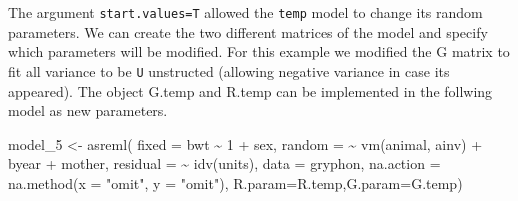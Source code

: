 \documentclass[
  12pt,
]{book}
\newenvironment{Shaded}{\begin{snugshade}}{\end{snugshade}}
\newcommand{\AttributeTok}[1]{\textcolor[rgb]{0.77,0.63,0.00}{#1}}
\newcommand{\DecValTok}[1]{\textcolor[rgb]{0.00,0.00,0.81}{#1}}
\newcommand{\FunctionTok}[1]{\textcolor[rgb]{0.00,0.00,0.00}{#1}}
\newcommand{\NormalTok}[1]{#1}
\newcommand{\OtherTok}[1]{\textcolor[rgb]{0.56,0.35,0.01}{#1}}
\newcommand{\SpecialCharTok}[1]{\textcolor[rgb]{0.00,0.00,0.00}{#1}}
\newcommand{\StringTok}[1]{\textcolor[rgb]{0.31,0.60,0.02}{#1}}
\begin{document}
\begin{Shaded}
\end{Shaded}

The argument \texttt{start.values=T} allowed the \texttt{temp} model to change its random parameters. We can create the two different matrices of the model and specify which parameters will be modified. For this example we modified the G matrix to fit all variance to be \texttt{U} unstructed (allowing negative variance in case its appeared).
The object G.temp and R.temp can be implemented in the follwing model as new parameters.

\begin{Shaded}
\begin{Highlighting}[]
\NormalTok{model\_5 }\OtherTok{\textless{}{-}} \FunctionTok{asreml}\NormalTok{(}
  \AttributeTok{fixed =}\NormalTok{ bwt }\SpecialCharTok{\textasciitilde{}} \DecValTok{1} \SpecialCharTok{+}\NormalTok{ sex,}
  \AttributeTok{random =} \SpecialCharTok{\textasciitilde{}} \FunctionTok{vm}\NormalTok{(animal, ainv) }\SpecialCharTok{+}\NormalTok{ byear }\SpecialCharTok{+}\NormalTok{ mother,}
  \AttributeTok{residual =} \SpecialCharTok{\textasciitilde{}} \FunctionTok{idv}\NormalTok{(units),}
  \AttributeTok{data =}\NormalTok{ gryphon,}
  \AttributeTok{na.action =} \FunctionTok{na.method}\NormalTok{(}\AttributeTok{x =} \StringTok{"omit"}\NormalTok{, }\AttributeTok{y =} \StringTok{"omit"}\NormalTok{),}
  \AttributeTok{R.param=}\NormalTok{R.temp,}\AttributeTok{G.param=}\NormalTok{G.temp)}
\end{Highlighting}
\end{Shaded}
\end{document}
